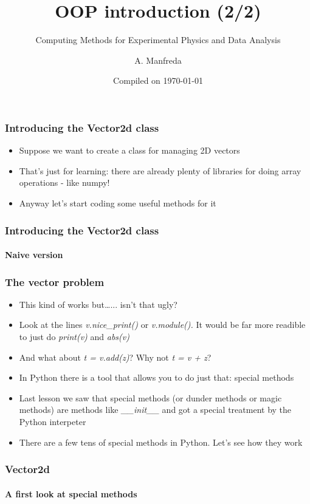 \documentclass[9pt]{beamer}
\title{OOP introduction (2/2)}
\subtitle{Computing Methods for Experimental Physics and Data Analysis}
\date{Compiled on \today}
\author{A. Manfreda}
\institute[INFN]{INFN--Pisa}
\begin{document}
\titleframe


\begin{frame}
  \frametitle{Introducing the Vector2d class}
  
  \begin{itemize}
    \item Suppose we want to create a class for managing 2D vectors
    \bigskip
    \item That's just for learning: there are already plenty of libraries for
          doing array operations - like numpy!
    \bigskip
    \item Anyway let's start coding some useful methods for it
  \end{itemize}
  
\end{frame}


\begin{frame}
  \frametitle{Introducing the Vector2d class}
  \framesubtitle{Naive version}
  
\end{frame}


\begin{frame}
  \frametitle{The vector problem}
  
  \begin{itemize}
    \item This kind of works but\dots... isn't that ugly?
    \medskip
    \item Look at the lines \emph{v.nice\_print()} or \emph{v.module().}
          It would be far more readible to just do \emph{print(v)} and \emph{abs(v)}
    \medskip
    \item And what about \emph{t = v.add(z)}? Why not \emph{t = v + z}?
    \medskip
    \item In Python there is a tool that allows you to do just that: \alert{special methods}
    \medskip
    \item Last lesson we saw that special methods (or dunder methods or 
          magic methods) are methods like \emph{\_\_init\_\_} and got a special
          treatment by the Python interpeter
    \medskip
    \item There are a few tens of special methods in Python. Let's see how they work
  \end{itemize}
  
\end{frame}

  
\begin{frame}
  \frametitle{Vector2d}
  \framesubtitle{A first look at special methods}
  
\end{frame}
\end{document}
